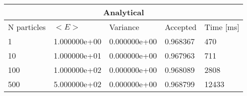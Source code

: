 \begin{tabular}{|l|l|l|l|l|}
\hline 
\multicolumn{5}{|c|}{Analytical}\\ 
\hline 
N particles & $<E>$ & Variance & Accepted & Time [ms]\\ 
 \hline 
1 & 1.000000e+00 & 0.000000e+00 & 0.968367 & 470 \\ 
\hline10 & 1.000000e+01 & 0.000000e+00 & 0.967963 & 711 \\ 
\hline100 & 1.000000e+02 & 0.000000e+00 & 0.968089 & 2808 \\ 
\hline500 & 5.000000e+02 & 0.000000e+00 & 0.968799 & 12433 \\ 
\hline\end{tabular}